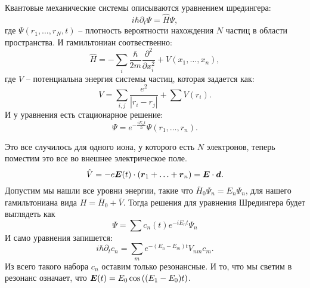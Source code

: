 Квантовые механические системы описываются уравнением шредингера:
\begin{equation*}
	i \hbar \partial_t \Psi = \hat{H} \Psi,
\end{equation*}
где $\Psi(r_1,\ldots,r_N, t)$ -- плотность вероятности нахождения $N $ частиц в области пространства.
И гамильтониан соотвественно:
\begin{equation*}
	\hat{H} = - \sum_i \frac{\hbar}{2 m} \frac{\partial^2}{\partial x_i^2} + V(x_1,\ldots,x_n),
\end{equation*}
где $V$ -- потенциальна энергия системы частиц, которая задается как:
\begin{equation*}
	V = \sum_{i,j} \frac{e^2}{|r_i - r_j|} + \sum V(r_i).
\end{equation*}
И у уравнения есть стационарное решение:
\begin{equation*}
	\Psi = e^{- \frac{i E_n t}{\hbar}} \Psi(r_1, \ldots, r_n).
\end{equation*}

Это все случилось для одного иона, у которого есть $N$ электронов, теперь поместим это все во внешнее электрическое поле.
\begin{equation*}
	\hat{V} = - e \mbox{\boldmath $E$}(t) \cdot (\mbox{\boldmath $r$}_1+ \ldots+ \mbox{\boldmath $r$}_n) = \mbox{\boldmath $E$} \cdot \mbox{\boldmath $d$}.
\end{equation*}
Допустим мы нашли все уровни энергии, такие что $\bar{H}_0 \Psi_n = E_n \Psi_n$, для нашего гамильтониана вида $H = \bar{H}_0 + \bar{V}$. Тогда решения для уравнения Шредингера будет выглядеть как
\begin{equation*}
	\Psi = \sum c_n (t) e^{-i E_n t} \Psi_n
\end{equation*}
И само уравнения запишется:
\begin{equation*}
	i \hbar \partial_t c_n = \sum_{m} e^{- (E_n - E_m)t} V_{n m} c_m.
\end{equation*}
Из всего такого набора $c_n$ оставим только резонансные. И то, что мы светим в резонанс означает, что $\mbox{\boldmath $E$}(t) = E_0 \cos \left((E_1 - E_0) t\right)$.

